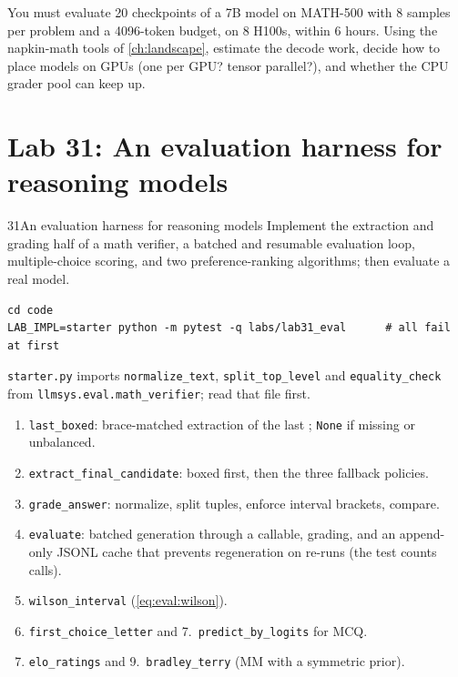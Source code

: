 \begin{exercise}
You must evaluate 20 checkpoints of a 7B model on MATH-500 with 8 samples per problem and a
4096-token budget, on 8 H100s, within 6 hours. Using the napkin-math tools of \cref{ch:landscape},
estimate the decode work, decide how to place models on GPUs (one per GPU? tensor parallel?), and
whether the CPU grader pool can keep up.
\end{exercise}

\section{Lab 31: An evaluation harness for reasoning models}\label{sec:eval:lab}

\begin{labbox}{31}{An evaluation harness for reasoning models}
Implement the extraction and grading half of a math verifier, a batched and resumable evaluation
loop, multiple-choice scoring, and two preference-ranking algorithms; then evaluate a real model.

\begin{lstlisting}[style=shell]
cd code
LAB_IMPL=starter python -m pytest -q labs/lab31_eval      # all fail at first
\end{lstlisting}
\texttt{starter.py} imports \texttt{normalize\_text}, \texttt{split\_top\_level} and
\texttt{equality\_check} from \texttt{llmsys.eval.math\_verifier}; read that file first.

\begin{enumerate}
  \item \texttt{last\_boxed}: brace-matched extraction of the last \bx{}; \texttt{None} if missing
  or unbalanced.
  \item \texttt{extract\_final\_candidate}: boxed first, then the three fallback policies.
  \item \texttt{grade\_answer}: normalize, split tuples, enforce interval brackets, compare.
  \item \texttt{evaluate}: batched generation through a callable, grading, and an append-only JSONL
  cache that prevents regeneration on re-runs (the test counts calls).
  \item \texttt{wilson\_interval} (\cref{eq:eval:wilson}).
  \item \texttt{first\_choice\_letter} and 7.\ \texttt{predict\_by\_logits} for MCQ.
  \setcounter{enumi}{7}
  \item \texttt{elo\_ratings} and 9.\ \texttt{bradley\_terry} (MM with a symmetric prior).
\end{enumerate}


\end{labbox}
